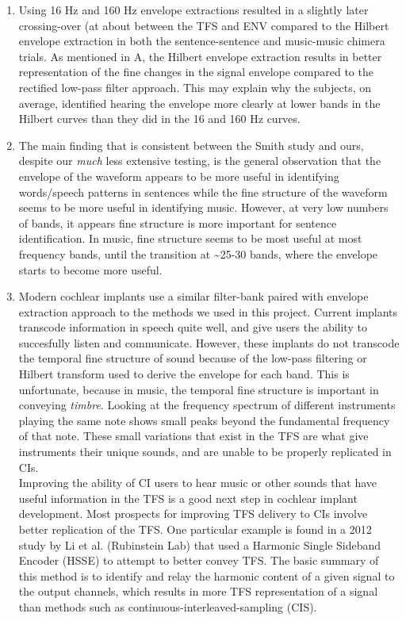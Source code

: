 \documentclass[9pt]{extarticle}
\begin{document}
\begin{enumerate}[label = \alph*)]
\begin{center}
\end{center}

\item Using 16 Hz and 160 Hz envelope extractions resulted in a slightly later crossing-over (at about  between the TFS and ENV compared to the Hilbert envelope extraction in both the sentence-sentence and music-music chimera trials. As mentioned in A, the Hilbert envelope extraction results in better representation of the fine changes in the signal envelope compared to the rectified low-pass filter approach. This may explain why the subjects, on average, identified hearing the envelope more clearly at lower bands in the Hilbert curves than they did in the 16 and 160 Hz curves.  

\item The main finding that is consistent between the Smith study and ours, despite our \textit{much} less extensive testing, is the general observation that the envelope of the waveform appears to be more useful in identifying words/speech patterns in sentences while the fine structure of the waveform seems to be more useful in identifying music. However, at very low numbers of bands, it appears fine structure is more important for sentence identification. In music, fine structure seems to be most useful at most frequency bands, until the transition at \textasciitilde 25-30 bands, where the envelope starts to become more useful.

\item Modern cochlear implants use a similar filter-bank paired with envelope extraction approach to the methods we used in this project. Current implants transcode information in speech quite well, and give users the ability to succesfully listen and communicate. However, these implants do not transcode the temporal fine structure of sound because of the low-pass filtering or Hilbert transform used to derive the envelope for each band. This is unfortunate, because in music, the temporal fine structure is important in conveying \textit{timbre}. Looking at the frequency spectrum of different instruments playing the same note shows small peaks beyond the fundamental frequency of that note. These small variations that exist in the TFS are what give instruments their unique sounds, and are unable to be properly replicated in CIs. \\

Improving the ability of CI users to hear music or other sounds that have useful information in the TFS is a good next step in cochlear implant development. Most prospects for improving TFS delivery to CIs involve better replication of the TFS. One particular example is found in a 2012 study by Li et al. (Rubinstein Lab) that used a Harmonic Single Sideband Encoder (HSSE) to attempt to better convey TFS. The basic summary of this method is to identify and relay the harmonic content of a given signal to the output channels, which results in more TFS representation of a signal than methods such as continuous-interleaved-sampling (CIS). 


\end{enumerate}
\end{document}
